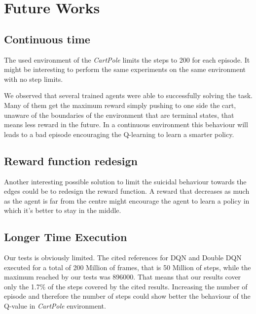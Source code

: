 
\section{Future Works}

\subsection{Continuous time}

The used environment of the \textit{CartPole} limits the steps to 200 for each episode. It might be interesting to perform the same experiments on the same environment with no step limits.

We observed that several trained agents were able to successfully solving the task. Many of them get the maximum reward simply pushing to one side the cart, unaware of the boundaries of the environment that are terminal states, that means less reward in the future. In a continuous environment this behaviour will leads to a bad episode encouraging the Q-learning to learn a smarter policy.

\subsection{Reward function redesign}

Another interesting possible solution to limit the suicidal behaviour towards the edges could be to redesign the reward function. A reward that decreases as much as the agent is far from the centre might encourage the agent to learn a policy in which it's better to stay in the middle.

\subsection{Longer Time Execution}

Our tests is obviously limited. The cited references for DQN and Double DQN executed for a total of 200 Million of frames, that is 50 Million of steps, while the maximum reached by our tests was 896000. That means that our results cover only the 1.7\% of the steps covered by the cited results. Increasing the number of episode and therefore the number of steps could show better the behaviour of the Q-value in \textit{CartPole} environment.